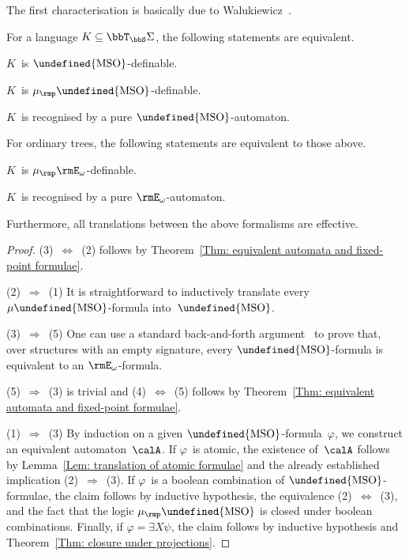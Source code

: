 \documentclass[10pt, fleqn]{scrartcl}
\makeatletter
\newcommand\m@thsm@ller[2]{\mbox{\relscale{0.91}$\m@th#1#2$}}
\let\smaller\undefined
\DeclareRobustCommand\smaller[1]{\relax\ifmmode{\mathpalette\m@thsm@ller{#1}}\else{\relscale{0.91}#1}\fi}
\newcommand*{\MSO}{\smaller{\mathrm{MSO}}}
\newcommand*{\mup}{\mu_\rmp}
\newcommand*{\?}{\kern .08em}
\makeatother
\begin{document}
The first characterisation is basically due to Walukiewicz~\cite{Walukiewicz02}.
\begin{Thm}\label{Thm: characterisation of MSO}
For a language $K \subseteq \bbT_\bbS\Sigma$, the following statements are equivalent.
\begin{enum1}
\item $K$~is $\MSO$-definable.
\item $K$~is $\mup\MSO$-definable.
\item $K$~is recognised by a pure $\MSO$-automaton.
\end{enum1}
For ordinary trees, the following statements are equivalent to those above.
\begin{enum1}[start=4]
\item $K$~is $\mup\rmE_\omega$-definable.
\item $K$~is recognised by a pure $\rmE_\omega$-automaton.
\end{enum1}
Furthermore, all translations between the above formalisms are effective.
\end{Thm}
\begin{proof}
(3)~$\Leftrightarrow$~(2) follows by
Theorem~\ref{Thm: equivalent automata and fixed-point formulae}.

(2)~$\Rightarrow$~(1) It is straightforward to inductively translate every $\mu\MSO$-formula
into~$\MSO$.

(3)~$\Rightarrow$~(5) One can use a standard back-and-forth
argument~\cite{EbbinghausFlum95,BlumensathLN1} to prove that,
over structures with an empty signature, every $\MSO$-formula
is equivalent to an $\rmE_\omega$-formula.

(5)~$\Rightarrow$~(3) is trivial and
(4)~$\Leftrightarrow$~(5) follows by
Theorem~\ref{Thm: equivalent automata and fixed-point formulae}.

(1)~$\Rightarrow$~(3) By induction on a given $\MSO$-formula~$\varphi$,
we construct an equivalent automaton~$\calA$.
If $\varphi$~is atomic, the existence of~$\calA$ follows by
Lemma~\ref{Lem: translation of atomic formulae}
and the already established implication (2)~$\Rightarrow$~(3).
If $\varphi$~is a boolean combination of $\MSO$-formulae,
the claim follows by inductive hypothesis, the equivalence (2)~$\Leftrightarrow$~(3),
and the fact that the logic $\mup\MSO$ is closed under boolean combinations.
Finally, if $\varphi = \exists X\psi$, the claim follows by inductive hypothesis
and Theorem~\ref{Thm: closure under projections}.
\end{proof}
\end{document}
